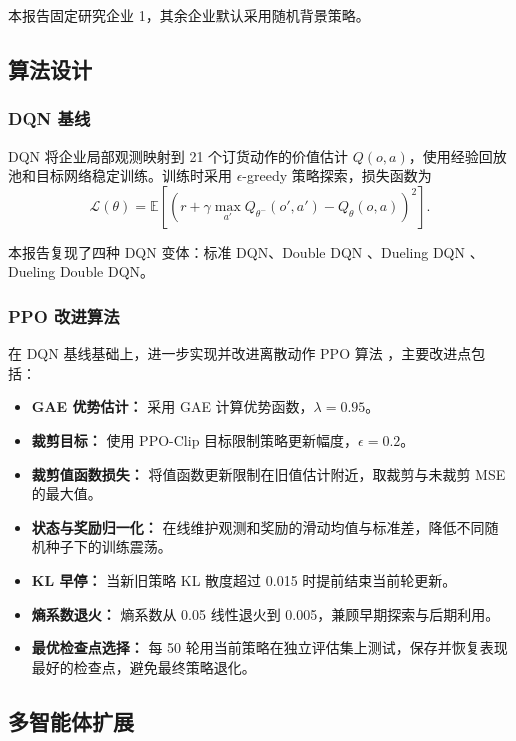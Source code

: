 \documentclass[nohyperref]{article}
\begin{document}
本报告固定研究企业 1，其余企业默认采用随机背景策略。

\subsection{算法设计}

\subsubsection{DQN 基线}

DQN \cite{mnih2015human} 将企业局部观测映射到 21 个订货动作的价值估计 $Q(o,a)$，使用经验回放池和目标网络稳定训练。训练时采用 $\epsilon$-greedy 策略探索，损失函数为
\begin{equation}
\mathcal{L}(\theta)=\mathbb{E}\left[\left(r+\gamma\max_{a'}Q_{\theta^-}(o',a')-Q_\theta(o,a)\right)^2\right].
\end{equation}

本报告复现了四种 DQN 变体：标准 DQN、Double DQN \cite{van2016deep}、Dueling DQN \cite{wang2016dueling}、Dueling Double DQN。

\subsubsection{PPO 改进算法}

在 DQN 基线基础上，进一步实现并改进离散动作 PPO 算法 \cite{schulman2017proximal}，主要改进点包括：
\begin{itemize}
    \item \textbf{GAE 优势估计：} 采用 GAE \cite{schulman2015high} 计算优势函数，$\lambda=0.95$。
    \item \textbf{裁剪目标：} 使用 PPO-Clip 目标限制策略更新幅度，$\epsilon=0.2$。
    \item \textbf{裁剪值函数损失：} 将值函数更新限制在旧值估计附近，取裁剪与未裁剪 MSE 的最大值。
    \item \textbf{状态与奖励归一化：} 在线维护观测和奖励的滑动均值与标准差，降低不同随机种子下的训练震荡。
    \item \textbf{KL 早停：} 当新旧策略 KL 散度超过 0.015 时提前结束当前轮更新。
    \item \textbf{熵系数退火：} 熵系数从 0.05 线性退火到 0.005，兼顾早期探索与后期利用。
    \item \textbf{最优检查点选择：} 每 50 轮用当前策略在独立评估集上测试，保存并恢复表现最好的检查点，避免最终策略退化。
\end{itemize}

\subsection{多智能体扩展}
\end{document}
